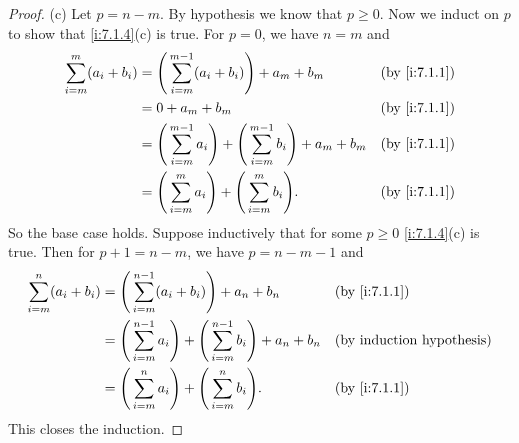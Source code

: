 \begin{proof}{(c)}
  Let \(p = n - m\).
  By hypothesis we know that \(p \geq 0\).
  Now we induct on \(p\) to show that \cref{i:7.1.4}(c) is true.
  For \(p = 0\), we have \(n = m\) and
  \begin{align*}
    \sum_{i = m}^m (a_i + b_i) & = \Bigg(\sum_{i = m}^{m - 1} (a_i + b_i)\Bigg) + a_m + b_m                                &  & \by{i:7.1.1} \\
                               & = 0 + a_m + b_m                                                                           &  & \by{i:7.1.1} \\
                               & = \Bigg(\sum_{i = m}^{m - 1} a_i\Bigg) + \Bigg(\sum_{i = m}^{m - 1} b_i\Bigg) + a_m + b_m &  & \by{i:7.1.1} \\
                               & = \Bigg(\sum_{i = m}^m a_i\Bigg) + \Bigg(\sum_{i = m}^m b_i\Bigg).                        &  & \by{i:7.1.1}
  \end{align*}
  So the base case holds.
  Suppose inductively that for some \(p \geq 0\) \cref{i:7.1.4}(c) is true.
  Then for \(p + 1 = n - m\), we have \(p = n - m - 1\) and
  \begin{align*}
    \sum_{i = m}^n (a_i + b_i) & = \Bigg(\sum_{i = m}^{n - 1} (a_i + b_i)\Bigg) + a_n + b_n                                &  & \by{i:7.1.1} \\
                               & = \Bigg(\sum_{i = m}^{n - 1} a_i\Bigg) + \Bigg(\sum_{i = m}^{n - 1} b_i\Bigg) + a_n + b_n &  & \byIH        \\
                               & = \Bigg(\sum_{i = m}^n a_i\Bigg) + \Bigg(\sum_{i = m}^n b_i\Bigg).                        &  & \by{i:7.1.1}
  \end{align*}
  This closes the induction.
\end{proof}

